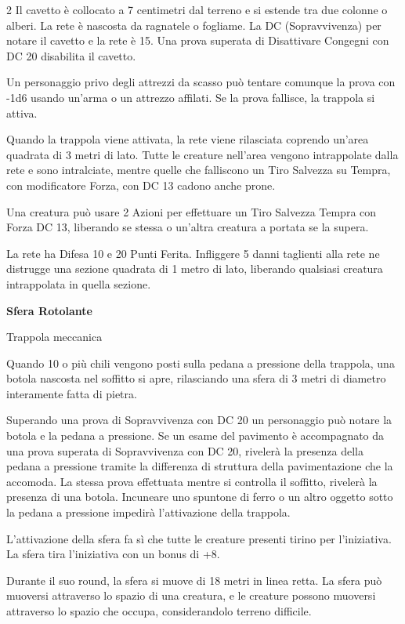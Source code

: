 \begin{multicols}{2}
Il cavetto è collocato a 7 centimetri dal terreno e si estende tra due colonne o alberi. La rete è nascosta da ragnatele o fogliame. La DC (Sopravvivenza) per notare il cavetto e la rete è 15. Una prova superata di Disattivare Congegni con DC 20 disabilita il cavetto.

Un personaggio privo degli attrezzi da scasso può tentare comunque la prova con -1d6 usando un'arma o un attrezzo affilati. Se la prova fallisce, la trappola si attiva.

Quando la trappola viene attivata, la rete viene rilasciata coprendo un'area quadrata di 3 metri di lato. Tutte le creature nell'area vengono intrappolate dalla rete e sono intralciate, mentre quelle che falliscono un Tiro Salvezza su Tempra, con modificatore Forza, con DC 13 cadono anche prone.

Una creatura può usare 2 Azioni per effettuare un Tiro Salvezza Tempra con Forza DC 13, liberando se stessa o un'altra creatura a portata se la supera.

La rete ha Difesa 10 e 20 Punti Ferita. Infliggere 5 danni taglienti alla rete ne distrugge una sezione quadrata di 1 metro di lato, liberando qualsiasi creatura intrappolata in quella sezione.

\medskip

\textbf{Sfera Rotolante}

Trappola meccanica

Quando 10 o più chili vengono posti sulla pedana a pressione della trappola, una botola nascosta nel soffitto si apre, rilasciando una sfera di 3 metri di diametro interamente fatta di pietra.

Superando una prova di Sopravvivenza con DC 20 un personaggio può notare la botola e la pedana a pressione. Se un esame del pavimento è accompagnato da una prova superata di Sopravvivenza con DC 20, rivelerà la presenza della pedana a pressione tramite la differenza di struttura della pavimentazione che la accomoda. La stessa prova effettuata mentre si controlla il soffitto, rivelerà la presenza di una botola. Incuneare uno spuntone di ferro o un altro oggetto sotto la pedana a pressione impedirà l'attivazione della trappola.

L'attivazione della sfera fa sì che tutte le creature presenti tirino per l'iniziativa. La sfera tira l'iniziativa con un bonus di +8.

Durante il suo round, la sfera si muove di 18 metri in linea retta. La sfera può muoversi attraverso lo spazio di una creatura, e le creature possono muoversi attraverso lo spazio che occupa, considerandolo terreno difficile.


\end{multicols}
